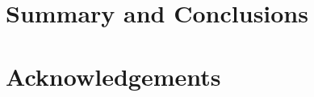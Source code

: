 \documentclass[11pt]{amsart}
\begin{document}




\section{Summary and Conclusions}\label{sec:conclusions}


\section*{Acknowledgements}



\end{document}
